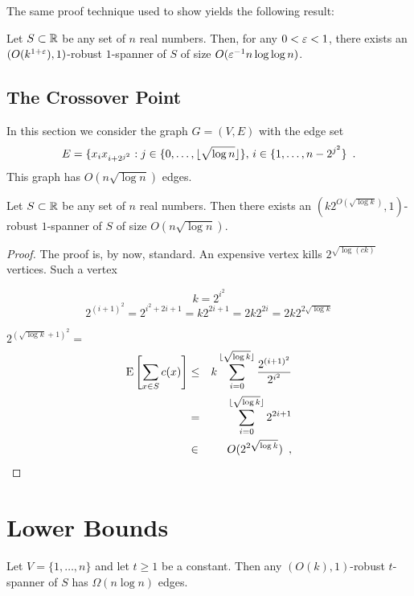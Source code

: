 \documentclass{patmorin}
\begin{document}
The same proof technique used to show  yields the
following result:

\begin{thm}
Let $S\subset \mathbb{R}$ be any set of $n$ real numbers.  Then, for any $0<\varepsilon
< 1$, there exists an $(O(k^{1+\varepsilon}),1)$-robust $1$-spanner of $S$
of size $O(\varepsilon^{-1}n\log\log n)$.
\end{thm}

\subsection{The Crossover Point}

In this section we consider the graph $G=(V,E)$ with the edge set
\[
   E = \{ x_ix_{i+2^{j^2}} : j\in\{0,\ldots,{\lfloor \sqrt{\log n} \rfloor}\},\,
       i\in\{1,\ldots,n-2^{j^2}\} \enspace .
\]
This graph has $O(n\sqrt{\log n})$ edges.

\begin{thm}
Let $S\subset \mathbb{R}$ be any set of $n$ real numbers.  Then there exists
an $(k2^{O(\sqrt{\log k})},1)$-robust $1$-spanner of $S$ of size
$O(n\sqrt{\log n})$.
\end{thm}

\begin{proof}
The proof is, by now, standard.  An expensive vertex kills $2^{\sqrt{\log (ck)}}$ vertices.  Such a vertex 

\[ k=2^{i^2} \]
\[ 2^{(i+1)^2} = 2^{i^2+2i+1} = k2^{2i+1} = 2k2^{2i} = 2k2^{2\sqrt{\log k}} \]

$2^{(\sqrt{\log k}+1)^2} = $
\begin{eqnarray*}
  \mathrm{E}\left[\sum_{x\in S} c(x)\right] 
    & \le & k\sum_{i=0}^{\lfloor\sqrt{\log k}\rfloor}\frac{2^{(i+1)^{2}}}{2^{i^{2}}} \\  
    & = & \sum_{i=0}^{\lfloor\sqrt{\log k}\rfloor}2^{2i+1} \\
    & \in & O(2^{2\sqrt{\log k}}) \enspace ,
\end{eqnarray*}

\end{proof}




\section{Lower Bounds}


\begin{thm}
Let $V=\{1,\ldots,n\}$ and let $t\ge 1$ be a constant.  Then any
$(O(k),1)$-robust $t$-spanner of $S$ has $\Omega(n\log n)$ edges.
\end{thm}
\end{document}
